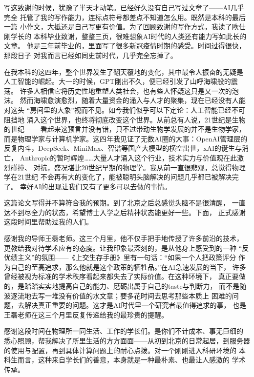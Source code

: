 \begin{acknowledgement}
写这致谢的时候，犹豫了半天才动笔。已经好久没有自己写过文章了——AI几乎完全
托管了我的写作能力，连标点符号都差点不知道怎么用。既然是本科的最后一篇
小作文，大抵还是自己写更有价值。为了回顾致谢的写作方式，我读了欧仕刚学长的
本科毕业致谢，整整三页，很难想象AI时代的人类还有能力写如此长的文章。
他是三年前毕业的，里面写了很多新冠疫情时期的感受。时间过得很快，那段日子
对我而言已经如同史前时代，几乎完全忘掉了。

在我本科的这四年，整个世界发生了翻天覆地的变化，其中最令人振奋的无疑是
人工智能的崛起。大一的时候，GPT刚出不久，便已经引发了山呼海啸般的震荡。
许多人相信它将历史性地重塑人类社会，也有些人怀疑这只是又一次的泡沫。
然而海啸愈演愈烈，随着大量资金的涌入与人才的聚集，现在已经没有人能对这头
``房间里的大象''视而不见。如今我们似乎可以下定论：人工智能已经不可阻挡地
涌入这个世界，也终将彻底改变这个世界。从前总有人说，21世纪是生物的世纪
——看起来这预言并没有错，只不过带动生物学发展的并不是生物学家，
而是物理学家与计算机学家。这四年我见证了无数AI圈的大事：OpenAI管理层的
反复内斗，DeepSeek、MiniMax、智谱等国产大模型的横空出世，xAI的诞生与消亡，
Anthropic的暂时辉煌……大量人才涌入这个行业，技术实力与价值观在此激烈碰撞、
对抗，盛况堪比20世纪早期的物理学。我从前一直很悲观，总觉得物理学在21世纪
不会再有大的变化了，能被聪明头脑解决的问题几乎都已被解决完了。
幸好AI的出现让我们又有了更多可以去做的事情。

这篇论文写得并不算符合我的预期。到了北京之后总感觉头脑不是很清醒，
一直达不到尽全力的状态，希望博士入学之后精神状态能更好一些。下面，
正式感谢这段时间里帮助过我的人们。

感谢我的导师王磊老师。这三个月里，他不仅手把手地传授了许多前沿的技术，
更教给我对待学术应有的态度。让我印象最深刻的，是从他身上感受到的一种
``反优绩主义''的氛围——《上交生存手册》里有一句话：``如果一个人把政策评分
作为自己的至高追求，那么他就是这个政策的牺牲品。''在AI急速发展的当下，
许多曾经被视为标准的学术秩序看起来都失去了实际价值。在这种环境下，
真正要做的，是踏踏实实地提高自己的能力、磨砺出属于自己的taste与判断力，
而不是随波逐流地去写一堆没有价值的水文章；要多花时间去思考那些本质上
困难的问题，去解决真正重要的问题。这才是AI时代里一个研究者最值得追求的事，
也是王磊老师在这三个月里反复传递给我的最珍贵的提醒。

感谢这段时间在物理所一同生活、工作的学长们。是你们不计成本、事无巨细的
悉心照顾，帮我解决了所里生活的方方面面——从初到北京的日常起居，到服务器
的使用与配置，再到具体计算问题上的耐心点拨。对一个刚刚进入科研环境的
本科生而言，这种来自学长们的善意，本身就是一种最朴素、也最让人感激的
学术传承。


\end{acknowledgement}
